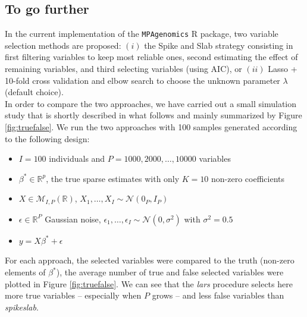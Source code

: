 \documentclass[a4paper,10pt]{article}
\begin{document}
  \subsection{To go further}
    In the current implementation of the \texttt{MPAgenomics} R package, two variable selection methods are proposed: $(i)$ the Spike and Slab strategy consisting in first filtering variables to keep most reliable ones, second estimating the effect of remaining variables, and third selecting variables (using AIC), or $(ii)$ Lasso + 10-fold cross validation and elbow search \cite{coude} to choose the unknown parameter $\lambda$ (default choice).\\
  
    In order to compare the two approaches, we have carried out a small simulation study that is shortly described in what follows and mainly summarized by Figure \ref{fig:truefalse}. We run the two approaches with 100 samples generated according to the following design: 
  \begin{itemize}
		\item $I=100$ individuals and $P=1000, 2000,\dots, 10000$ variables
		\item $\beta^* \in \mathbb{R}^p$, the true sparse estimates with only $K=10$ non-zero coefficients
		\item $X\in \mathcal{M}_{I,P}(\mathbb{R})$, $X_1,\dots,X_I \sim \mathcal{N}(0_P,I_P)$
		\item $\epsilon\in\mathbb{R}^P$ Gaussian noise, $\epsilon_1,\dots,\epsilon_I \sim \mathcal{N}(0,\sigma^2)$ with $\sigma^2=0.5$
		\item $y=X\beta^*+\epsilon$
	\end{itemize}	

For each approach, the selected variables were compared to the truth (non-zero elements of $\beta^*$), the average number of true and false selected variables were plotted in Figure \ref{fig:truefalse}. We can see that the \textit{lars} procedure selects here more true variables -- especially when $P$ grows -- and less false variables than \textit{spikeslab}.\\

\end{document}
